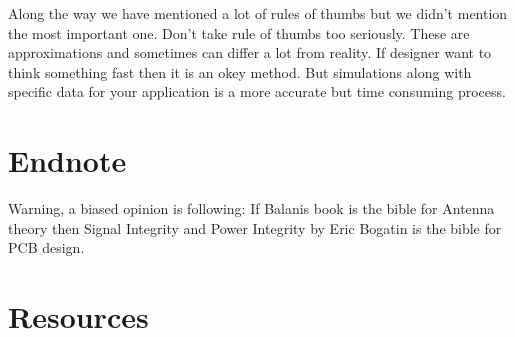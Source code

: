 \documentclass[12pt]{article}
\begin{document}
Along the way we have mentioned a lot of rules of thumbs but we didn't mention the most important one. Don't take rule of thumbs too seriously. These are approximations and sometimes can differ a lot from reality. If designer want to think something fast then it is an okey method. But simulations along with specific data for your application is a more accurate but time consuming process. 

\section{Endnote}

Warning, a biased opinion is following: If Balanis book is the bible for Antenna theory then Signal Integrity and Power Integrity by Eric Bogatin is the bible for PCB design.

\section{Resources}
\end{document}
